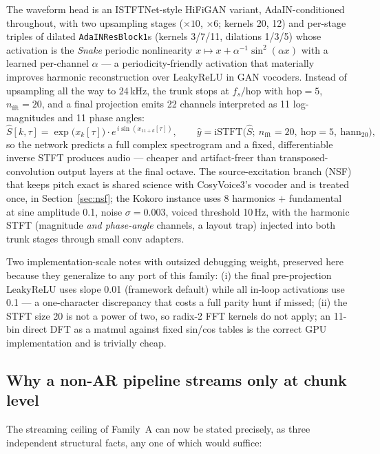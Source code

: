 \documentclass[11pt,a4paper]{article}
\newcommand{\fs}{\ensuremath{f_{s}}}                %
\newcommand{\code}[1]{\texttt{#1}}
\begin{document}
The waveform head is an ISTFTNet-style HiFiGAN variant, AdaIN-conditioned throughout,
with two upsampling stages ($\times10$, $\times6$; kernels 20, 12) and per-stage triples
of dilated \code{AdaINResBlock1}s (kernels 3/7/11, dilations 1/3/5) whose activation is
the \emph{Snake} periodic nonlinearity $x \mapsto x + \alpha^{-1}\sin^2(\alpha x)$ with a
learned per-channel $\alpha$ --- a periodicity-friendly activation that materially
improves harmonic reconstruction over LeakyReLU in GAN vocoders. Instead of upsampling
all the way to 24\,kHz, the trunk stops at $\fs/\mathrm{hop}$ with $\mathrm{hop}=5$,
$n_{\mathrm{fft}}=20$, and a final projection emits 22 channels
interpreted as 11 log-magnitudes and 11 phase angles:
\begin{equation}
\hat{S}[k,\tau] = \exp\big(x_{k}[\tau]\big)\cdot
e^{\,i \sin(x_{11+k}[\tau])}, \qquad
\hat{y} = \mathrm{iSTFT}\big(\hat S;\ n_{\mathrm{fft}}{=}20,\ \mathrm{hop}{=}5,\
\mathrm{hann}_{20}\big),
\label{eq:istft-head}
\end{equation}
so the network predicts a full complex spectrogram and a fixed, differentiable inverse
STFT produces audio --- cheaper and artifact-freer than transposed-convolution output
layers at the final octave. The source-excitation branch (NSF) that keeps pitch exact is
shared science with CosyVoice3's vocoder and is treated once, in
Section~\ref{sec:nsf}; the Kokoro instance uses 8 harmonics $+$ fundamental at
sine amplitude 0.1, noise $\sigma = 0.003$, voiced threshold 10\,Hz, with the harmonic
STFT (magnitude \emph{and phase-angle} channels, a layout trap) injected into both
trunk stages through small conv adapters.

Two implementation-scale notes with outsized debugging weight, preserved here because
they generalize to any port of this family: (i) the final pre-projection LeakyReLU uses
slope 0.01 (framework default) while all in-loop activations use 0.1 --- a
one-character discrepancy that costs a full parity hunt if missed; (ii) the STFT size 20
is not a power of two, so radix-2 FFT kernels do not apply; an 11-bin direct DFT as a
matmul against fixed sin/cos tables is the correct GPU implementation and is trivially
cheap.

\subsection{Why a non-AR pipeline streams only at chunk level}
\label{sec:kokoro-noar}

The streaming ceiling of Family~A can now be stated precisely, as three independent
structural facts, any one of which would suffice:
\end{document}
